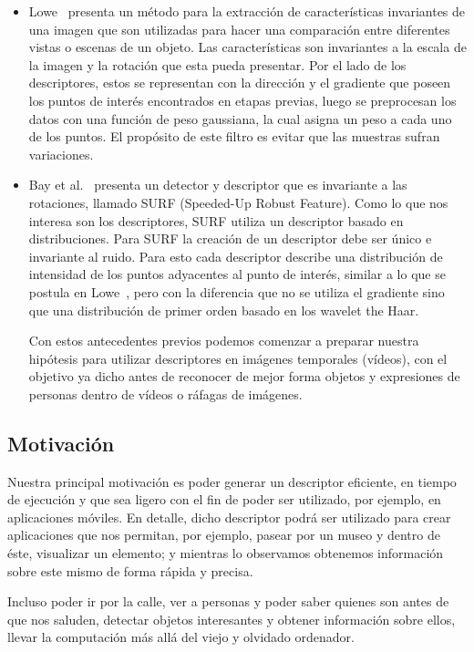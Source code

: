 \documentclass{udparticle}
\begin{document}
\begin{itemize}
  \item Lowe~\cite{sift} presenta un método para la extracción de características invariantes de una imagen que son utilizadas para hacer una comparación entre diferentes vistas o escenas de un objeto. Las características son invariantes a la escala de la imagen y la rotación que esta pueda presentar. Por el lado de los descriptores, estos se representan con la dirección y el gradiente que poseen los puntos de interés encontrados en etapas previas, luego se preprocesan los datos con una función de peso gaussiana, la cual asigna un peso a cada uno de los puntos. El propósito de este filtro es evitar que las muestras sufran variaciones.

  \item Bay et al.~\cite{surf} presenta un detector y descriptor que es invariante a las rotaciones, llamado SURF (Speeded-Up Robust Feature). Como lo que nos interesa son los descriptores, SURF utiliza un descriptor basado en distribuciones. Para SURF la creación de un descriptor debe ser único e invariante al ruido. Para esto cada descriptor describe una distribución de intensidad de los puntos adyacentes al punto de interés, similar a lo que se postula en Lowe~\cite{sift}, pero con la diferencia que no se utiliza el gradiente sino que una distribución de primer orden basado en los wavelet the Haar.

Con estos antecedentes previos podemos comenzar a preparar nuestra hipótesis para utilizar descriptores en imágenes temporales (vídeos), con el objetivo ya dicho antes de reconocer de mejor forma objetos y expresiones de personas dentro de vídeos o ráfagas de imágenes.
\end{itemize}
\subsection{Motivación}
Nuestra principal motivación es poder generar un descriptor eficiente, en tiempo de ejecución y que sea ligero con el fin de poder ser utilizado, por ejemplo, en aplicaciones móviles. En detalle, dicho descriptor podrá ser utilizado para crear aplicaciones que nos permitan, por ejemplo, pasear por un museo y dentro de éste, visualizar un elemento; y mientras lo observamos obtenemos información sobre este mismo de forma rápida y precisa.

Incluso poder ir por la calle, ver a personas  y poder saber quienes son antes de que nos saluden, detectar objetos interesantes y obtener información sobre ellos, llevar la computación más allá del viejo y olvidado ordenador.
\end{document}
